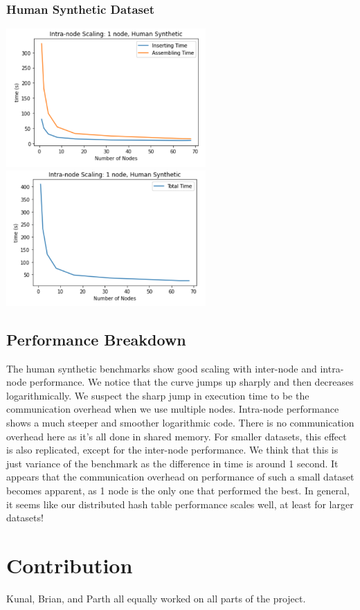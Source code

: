 \documentclass{article}
\begin{document}
\subsubsection{Human Synthetic Dataset}
\centerline{\includegraphics[width=3in]{figures/intra-human-prof.png}\includegraphics[width=3in]{figures/intra-human.png}}


\subsection{Performance Breakdown}
The human synthetic benchmarks show good scaling with inter-node and intra-node performance. We notice that the curve jumps up sharply and then decreases logarithmically. We suspect the sharp jump in execution time to be the communication overhead when we use multiple nodes. Intra-node performance shows a much steeper and smoother logarithmic code. There is no communication overhead here as it’s all done in shared memory. For smaller datasets, this effect is also replicated, except for the inter-node performance. We think that this is just variance of the benchmark as the difference in time is around 1 second. It appears that the communication overhead on performance of such a small dataset becomes apparent, as 1 node is the only one that performed the best. In general, it seems like our distributed hash table performance scales well, at least for larger datasets!

\section{Contribution}
Kunal, Brian, and Parth all equally worked on all parts of the project.



\end{document}

